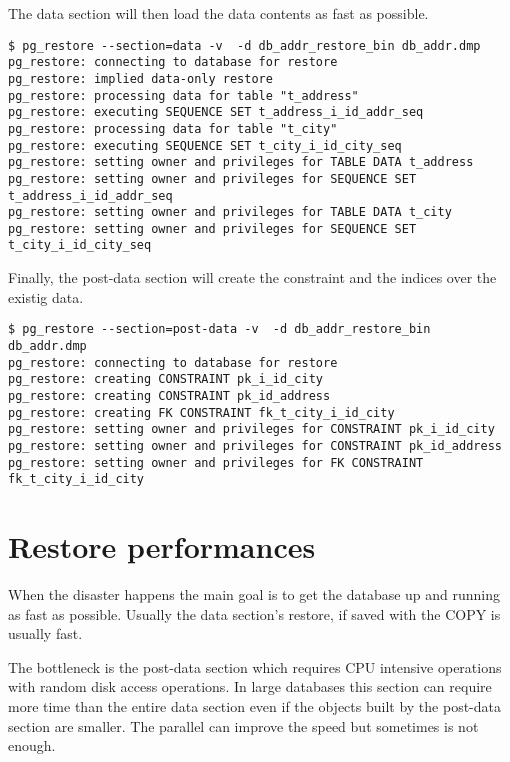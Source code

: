 The data section will then load the data contents as fast as possible.

\begin{verbatim}
$ pg_restore --section=data -v  -d db_addr_restore_bin db_addr.dmp
pg_restore: connecting to database for restore
pg_restore: implied data-only restore
pg_restore: processing data for table "t_address"
pg_restore: executing SEQUENCE SET t_address_i_id_addr_seq
pg_restore: processing data for table "t_city"
pg_restore: executing SEQUENCE SET t_city_i_id_city_seq
pg_restore: setting owner and privileges for TABLE DATA t_address
pg_restore: setting owner and privileges for SEQUENCE SET t_address_i_id_addr_seq
pg_restore: setting owner and privileges for TABLE DATA t_city
pg_restore: setting owner and privileges for SEQUENCE SET t_city_i_id_city_seq

\end{verbatim}

Finally, the post-data section will create the constraint and the indices over the existig data.

\begin{verbatim}
$ pg_restore --section=post-data -v  -d db_addr_restore_bin db_addr.dmp
pg_restore: connecting to database for restore
pg_restore: creating CONSTRAINT pk_i_id_city
pg_restore: creating CONSTRAINT pk_id_address
pg_restore: creating FK CONSTRAINT fk_t_city_i_id_city
pg_restore: setting owner and privileges for CONSTRAINT pk_i_id_city
pg_restore: setting owner and privileges for CONSTRAINT pk_id_address
pg_restore: setting owner and privileges for FK CONSTRAINT fk_t_city_i_id_city

\end{verbatim}


\section{Restore performances}

When the disaster happens the main goal is to get the database up and running as fast as possible.
Usually the data section's restore, if saved with the COPY is usually fast.\newline

The bottleneck is the post-data section which requires CPU intensive operations with random disk access
operations. In large databases this section can require more time than the entire data section even
if the objects built by the post-data section are smaller. The parallel can improve the speed but
sometimes is not enough. \newline

